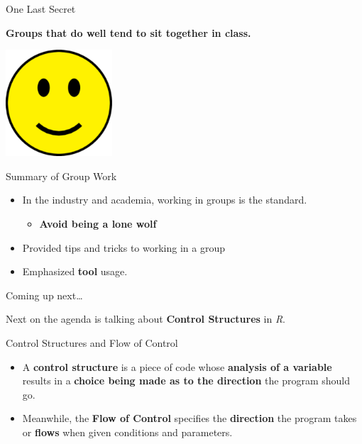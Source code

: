 \begin{frame}{One Last Secret}

\textbf{Groups that do well tend to sit together in class.}

\begin{center}\includegraphics[width=150px]{figures/smiley_face} \end{center}

\end{frame}

\begin{frame}{Summary of Group Work}

\begin{itemize}
\tightlist
\item
  In the industry and academia, working in groups is the standard.

  \begin{itemize}
  \tightlist
  \item
    \textbf{Avoid being a lone wolf}
  \end{itemize}
\item
  Provided tips and tricks to working in a group
\item
  Emphasized \textbf{tool} usage.
\end{itemize}

\end{frame}

\begin{frame}{Coming up next\ldots{}}

Next on the agenda is talking about \textbf{Control Structures} in
\emph{R}.

\end{frame}

\begin{frame}{Control Structures and Flow of Control}

\begin{itemize}
\item
  A \textbf{control structure} is a piece of code whose \textbf{analysis
  of a variable} results in a \textbf{choice being made as to the
  direction} the program should go.
\item
  Meanwhile, the \textbf{Flow of Control} specifies the
  \textbf{direction} the program takes or \textbf{flows} when given
  conditions and parameters.
\end{itemize}

\end{frame}

